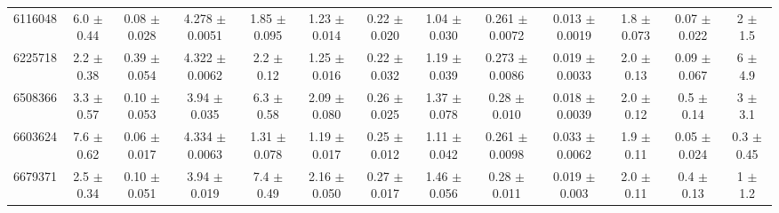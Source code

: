\begin{table}[H]
\begin{tabular}{c|cccccc|cccccc}
6116048  &        6.0    $\pm$  0.44   &      0.08   $\pm$  0.028  &      4.278  $\pm$  0.0051 &      1.85   $\pm$  0.095  &      1.23   $\pm$  0.014  &      0.22   $\pm$  0.020    &        1.04   $\pm$  0.030    &        0.261  $\pm$  0.0072   &        0.013  $\pm$  0.0019   &        1.8    $\pm$  0.073    &        0.07   $\pm$  0.022    &        2      $\pm$  1.5      \\
6225718  &        2.2    $\pm$  0.38   &      0.39   $\pm$  0.054  &      4.322  $\pm$  0.0062 &      2.2    $\pm$  0.12   &      1.25   $\pm$  0.016  &      0.22   $\pm$  0.032    &        1.19   $\pm$  0.039    &        0.273  $\pm$  0.0086   &        0.019  $\pm$  0.0033   &        2.0    $\pm$  0.13     &        0.09   $\pm$  0.067    &        6      $\pm$  4.9      \\
6508366  &        3.3    $\pm$  0.57   &      0.10   $\pm$  0.053  &      3.94   $\pm$  0.035  &      6.3    $\pm$  0.58   &      2.09   $\pm$  0.080  &      0.26   $\pm$  0.025    &        1.37   $\pm$  0.078    &        0.28   $\pm$  0.010    &        0.018  $\pm$  0.0039   &        2.0    $\pm$  0.12     &        0.5    $\pm$  0.14     &        3      $\pm$  3.1      \\
6603624  &        7.6    $\pm$  0.62   &      0.06   $\pm$  0.017  &      4.334  $\pm$  0.0063 &      1.31   $\pm$  0.078  &      1.19   $\pm$  0.017  &      0.25   $\pm$  0.012    &        1.11   $\pm$  0.042    &        0.261  $\pm$  0.0098   &        0.033  $\pm$  0.0062   &        1.9    $\pm$  0.11     &        0.05   $\pm$  0.024    &        0.3    $\pm$  0.45     \\
6679371  &        2.5    $\pm$  0.34   &      0.10   $\pm$  0.051  &      3.94   $\pm$  0.019  &      7.4    $\pm$  0.49   &      2.16   $\pm$  0.050  &      0.27   $\pm$  0.017    &        1.46   $\pm$  0.056    &        0.28   $\pm$  0.011    &        0.019  $\pm$  0.003    &        2.0    $\pm$  0.11     &        0.4    $\pm$  0.13     &        1      $\pm$  1.2      \\

\end{tabular}
\end{table}
